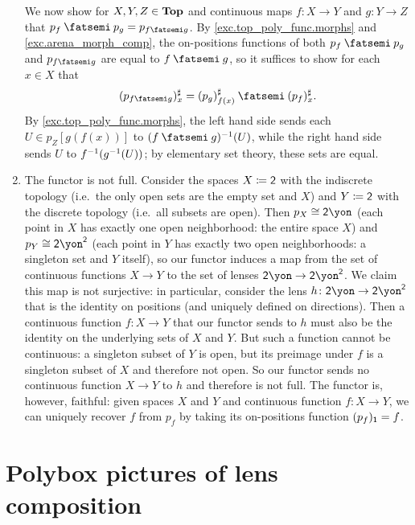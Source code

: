 \documentclass[Book-Poly]{subfiles}
\begin{document}
\begin{exercise}
\begin{solution}
\begin{enumerate}
	We now show for $X,Y,Z\in\mathbf{Top}$ and continuous maps $f\colon X\to Y$ and $g\colon Y\to Z$ that $p_f\then p_g = p_{f\then g}$.
	By \cref{exc.top_poly_func.morphs} and \cref{exc.arena_morph_comp}, the on-positions functions of both $p_f\then p_g$ and $p_{f\then g}$ are equal to $f\then g$, so it suffices to show for each $x\in X$ that
	\[
	    (p_{f \then g})^\sharp_x = (p_g)^\sharp_{f(x)} \then (p_f)^\sharp_x.
	\]
	By \cref{exc.top_poly_func.morphs}, the left hand side sends each $U\in p_Z[g(f(x))]$ to $(f \then g)\inv(U)$, while the right hand side sends $U$ to $f^{-1}(g^{-1}(U))$; by elementary set theory, these sets are equal.

	\item The functor is not full.
	Consider the spaces $X\coloneqq\textsf{2}$ with the indiscrete topology (i.e.\ the only open sets are the empty set and $X$) and $Y\coloneqq\textsf{2}$ with the discrete topology (i.e.\ all subsets are open).
	Then $p_X\iso\2\yon$ (each point in $X$ has exactly one open neighborhood: the entire space $X$) and $p_Y\iso\2\yon^\2$ (each point in $Y$ has exactly two open neighborhoods: a singleton set and $Y$ itself), so our functor induces a map from the set of continuous functions $X\to Y$ to the set of lenses $\2\yon\to\2\yon^\2$.
	We claim this map is not surjective: in particular, consider the lens $h\colon\2\yon\to\2\yon^\2$ that is the identity on positions (and uniquely defined on directions).
	Then a continuous function $f\colon X\to Y$ that our functor sends to $h$ must also be the identity on the underlying sets of $X$ and $Y$.
	But such a function cannot be continuous: a singleton subset of $Y$ is open, but its preimage under $f$ is a singleton subset of $X$ and therefore not open.
	So our functor sends no continuous function $X\to Y$ to $h$ and therefore is not full.
	The functor is, however, faithful: given spaces $X$ and $Y$ and continuous function $f\colon X\to Y$, we can uniquely recover $f$ from $p_f$ by taking its on-positions function $(p_f)_{\textsf{1}}=f$.
\end{enumerate}
\end{solution}
\end{exercise}

\section{Polybox pictures of lens composition} \label{sec.poly.cat.}

\end{document}
